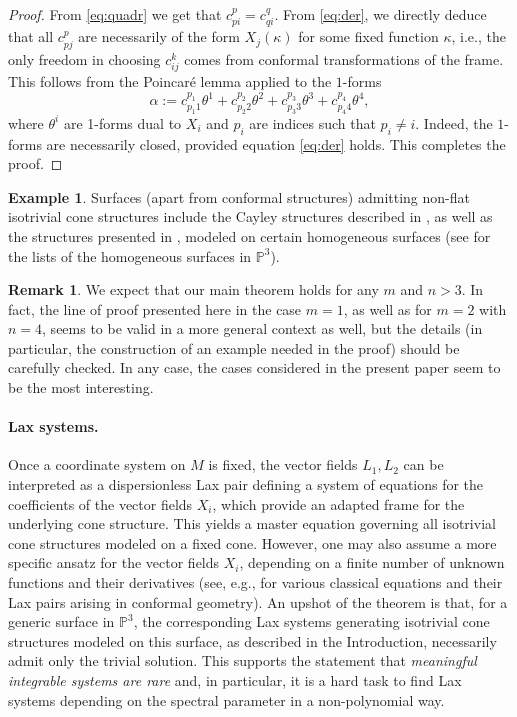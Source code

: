 \documentclass[11pt]{amsart}
\theoremstyle{definition}
\newtheorem{remark}{Remark}
\newtheorem*{example}{Example}
\newcommand{\PP}{\mathbb{P}}
\begin{document}
\begin{proof}
From \eqref{eq:quadr} we get that $c^p_{pi}=c^q_{qi}$. From \eqref{eq:der}, we directly deduce that all $c^p_{pj}$ are necessarily of the form $X_j(\kappa)$ for some fixed function $\kappa$, i.e., the only freedom in choosing $c^k_{ij}$ comes from conformal transformations of the frame. This follows from the Poincaré lemma applied to the $1$-forms
\[
\alpha:=c^{p_1}_{{p_1}1}\theta^1+c^{p_2}_{{p_2}2}\theta^2+c^{p_3}_{{p_3}3}\theta^3+c^{p_4}_{{p_4}4}\theta^4,
\]
where $\theta^i$ are 1-forms dual to $X_i$ and $p_i$ are indices such that $p_i\neq i$. Indeed, the $1$-forms are necessarily closed, provided equation \eqref{eq:der} holds. This completes the proof.
\end{proof}

\begin{example}
Surfaces (apart from conformal structures) admitting non-flat isotrivial cone structures include the Cayley structures described in \cite{KM}, as well as the structures presented in \cite{K3}, modeled on certain homogeneous surfaces (see \cite{DSV,DDKR} for the lists of the homogeneous surfaces in $\PP^3$).
\end{example}

\begin{remark}
We expect that our main theorem holds for any $m$ and $n>3$. In fact, the line of proof presented here in the case $m=1$, as well as for $m=2$ with $n=4$, seems to be valid in a more general context as well, but the details (in particular, the construction of an example needed in the proof) should be carefully checked. In any case, the cases considered in the present paper seem to be the most interesting.
\end{remark}

\paragraph{\bf Lax systems.}
Once a coordinate system on $M$ is fixed, the vector fields $L_1, L_2$ can be interpreted as a dispersionless Lax pair defining a system of equations for the coefficients of the vector fields $X_i$, which provide an adapted frame for the underlying cone structure. This yields a master equation governing all isotrivial cone structures modeled on a fixed cone. However, one may also assume a more specific ansatz for the vector fields $X_i$, depending on a finite number of unknown functions and their derivatives (see, e.g., \cite[Section 8]{FK1} for various classical equations and their Lax pairs arising in conformal geometry). An upshot of the theorem is that, for a generic surface in $\PP^3$, the corresponding Lax systems generating isotrivial cone structures modeled on this surface, as described in the Introduction, necessarily admit only the trivial solution. This supports the statement that \emph{meaningful integrable systems are rare} and, in particular, it is a hard task to find Lax systems depending on the spectral parameter in a non-polynomial way.
\end{document}
